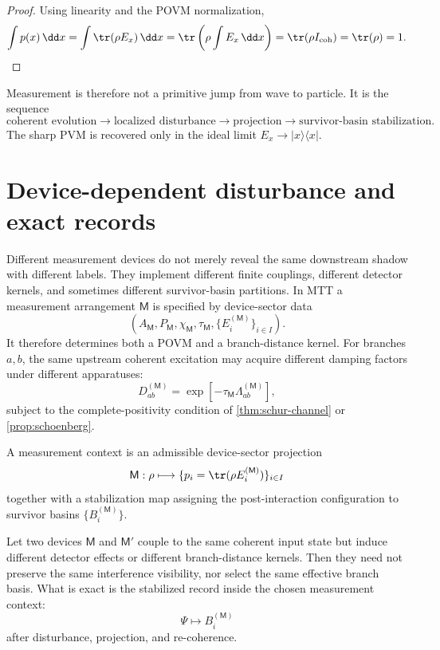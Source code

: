 \documentclass[11pt]{article}
\newcommand{\coh}{\mathrm{coh}}
\newcommand{\Meas}{\mathsf M}
\begin{document}
\begin{proof}
Using linearity and the POVM normalization,
\[
  \int p(x)\,\dd x
  =
  \int \tr(\rho E_x)\,\dd x
  =
  \tr\left(\rho\int E_x\,\dd x\right)
  =
  \tr(\rho I_{\coh})
  =
  \tr(\rho)
  =
  1.
\]
\end{proof}

Measurement is therefore not a primitive jump from wave to particle. It is the sequence
\[
  \text{coherent evolution}
  \to
  \text{localized disturbance}
  \to
  \text{projection}
  \to
  \text{survivor-basin stabilization}.
\]
The sharp PVM is recovered only in the ideal limit \(E_x\to |x\rangle\langle x|\).

\section{Device-dependent disturbance and exact records}

Different measurement devices do not merely reveal the same downstream shadow with different
labels. They implement different finite couplings, different detector kernels, and sometimes
different survivor-basin partitions. In MTT a measurement arrangement \(\Meas\) is specified by
device-sector data
\[
  (A_{\Meas},P_{\Meas},\chi_{\Meas},\tau_{\Meas},\{E_i^{(\Meas)}\}_{i\in I}).
\]
It therefore determines both a POVM and a branch-distance kernel. For branches \(a,b\), the
same upstream coherent excitation may acquire different damping factors under different
apparatuses:
\[
  D_{ab}^{(\Meas)}
  =
  \exp[-\tau_{\Meas}\Lambda_{ab}^{(\Meas)}],
\]
subject to the complete-positivity condition of \cref{thm:schur-channel} or
\cref{prop:schoenberg}.

\begin{definition}
A measurement context is an admissible device-sector projection
\[
  \Meas:\rho\longmapsto
  \{p_i=\tr(\rho E_i^{(\Meas)})\}_{i\in I}
\]
together with a stabilization map assigning the post-interaction configuration to survivor
basins \(\{B_i^{(\Meas)}\}\).
\end{definition}

\begin{proposition}
Let two devices \(\Meas\) and \(\Meas'\) couple to the same coherent input state but induce
different detector effects or different branch-distance kernels. Then they need not preserve
the same interference visibility, nor select the same effective branch basis. What is exact is
the stabilized record inside the chosen measurement context:
\[
  \Psi\longmapsto B_i^{(\Meas)}
\]
after disturbance, projection, and re-coherence.
\end{proposition}
\end{document}

